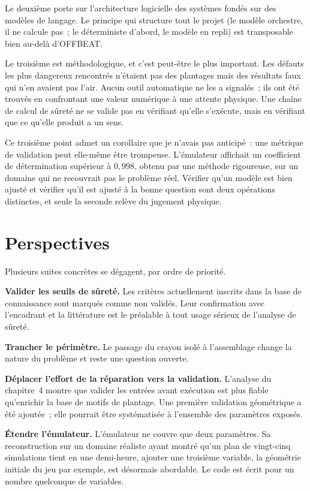\documentclass[12pt,a4paper,french]{report}
\begin{document}
Le deuxième porte sur l'architecture logicielle des systèmes fondés sur des
modèles de langage. Le principe qui structure tout le projet (le modèle
orchestre, il ne calcule pas~; le déterministe d'abord, le modèle en repli) est
transposable bien au-delà d'OFFBEAT.

Le troisième est méthodologique, et c'est peut-être le plus important. Les
défauts les plus dangereux rencontrés n'étaient pas des plantages mais des
résultats faux qui n'en avaient pas l'air. Aucun outil automatique ne les a
signalés~; ils ont été trouvés en confrontant une valeur numérique à une
attente physique. Une chaîne de calcul de sûreté ne se valide pas en vérifiant
qu'elle s'exécute, mais en vérifiant que ce qu'elle produit a un sens.

Ce troisième point admet un corollaire que je n'avais pas anticipé~: une
métrique de validation peut elle-même être trompeuse. L'émulateur affichait un
coefficient de détermination supérieur à $0{,}998$, obtenu par une méthode
rigoureuse, sur un domaine qui ne recouvrait pas le problème réel. Vérifier
qu'un modèle est bien ajusté et vérifier qu'il est ajusté à la bonne question
sont deux opérations distinctes, et seule la seconde relève du jugement
physique.

\section*{Perspectives}

Plusieurs suites concrètes se dégagent, par ordre de priorité.

\textbf{Valider les seuils de sûreté.} Les critères actuellement inscrits dans
la base de connaissance sont marqués comme non validés. Leur confirmation avec
l'encadrant et la littérature est le préalable à tout usage sérieux de
l'analyse de sûreté.

\textbf{Trancher le périmètre.} Le passage du crayon isolé à l'assemblage
change la nature du problème et reste une question ouverte.

\textbf{Déplacer l'effort de la réparation vers la validation.} L'analyse du
chapitre~4 montre que valider les entrées avant exécution est plus fiable
qu'enrichir la base de motifs de plantage. Une première validation géométrique
a été ajoutée~; elle pourrait être systématisée à l'ensemble des paramètres
exposés.

\textbf{Étendre l'émulateur.} L'émulateur ne couvre que deux paramètres. Sa
reconstruction sur un domaine réaliste ayant montré qu'un plan de vingt-cinq
simulations tient en une demi-heure, ajouter une troisième variable, la
géométrie initiale du jeu par exemple, est désormais abordable. Le code est
écrit pour un nombre quelconque de variables.
\end{document}
